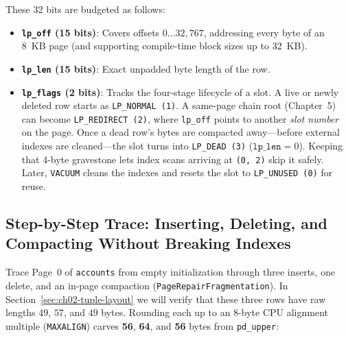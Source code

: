 These 32 bits are budgeted as follows:
\begin{itemize}
  \item \textbf{\texttt{lp\_off} (15 bits)}: Covers offsets $0 \dots 32{,}767$, addressing every byte of an 8~KB page (and supporting compile-time block sizes up to 32~KB).
  \item \textbf{\texttt{lp\_len} (15 bits)}: Exact unpadded byte length of the row.
  \item \textbf{\texttt{lp\_flags} (2 bits)}: Tracks the four-stage lifecycle of a slot. A live or newly deleted row starts as \texttt{LP\_NORMAL (1)}. A same-page chain root (Chapter~5) can become \texttt{LP\_REDIRECT (2)}, where \texttt{lp\_off} points to another \emph{slot number} on the page. Once a dead row's bytes are compacted away---before external indexes are cleaned---the slot turns into \texttt{LP\_DEAD (3)} ($\texttt{lp\_len} = 0$). Keeping that 4-byte gravestone lets index scans arriving at \texttt{(0, 2)} skip it safely. Later, \texttt{VACUUM} cleans the indexes and resets the slot to \texttt{LP\_UNUSED (0)} for reuse.
\end{itemize}

\subsection{Step-by-Step Trace: Inserting, Deleting, and Compacting Without Breaking Indexes}

Trace Page~0 of \texttt{accounts} from empty initialization through three inserts, one delete, and an in-page compaction (\texttt{PageRepairFragmentation}). In Section~\ref{sec:ch02-tuple-layout} we will verify that these three rows have raw lengths $49$, $57$, and $49$ bytes. Rounding each up to an 8-byte CPU alignment multiple (\texttt{MAXALIGN}) carves \textbf{56}, \textbf{64}, and \textbf{56} bytes from \texttt{pd\_upper}:

